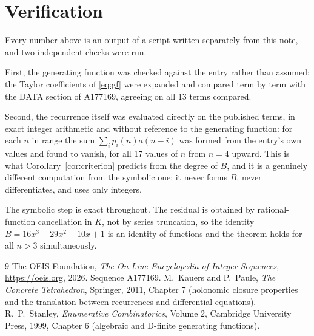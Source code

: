 \documentclass[11pt,a4paper]{article}
\theoremstyle{plain}
\theoremstyle{definition}
\begin{document}
\section{Verification}

Every number above is an output of a script written separately from this note, and two
independent checks were run.

First, the generating function was checked against the entry rather than assumed: the
Taylor coefficients of \eqref{eq:gf} were expanded and compared term by term with the DATA
section of A177169, agreeing on all 13 terms compared.

Second, the recurrence itself was evaluated directly on the published terms, in exact
integer arithmetic and without reference to the generating function: for each $n$ in range
the sum $\sum_{i}p_{i}(n)a(n-i)$ was formed from the entry's own values and found to
vanish, for all 17 values of $n$ from $n=4$ upward. This is what
Corollary~\ref{cor:criterion} predicts from the degree of $B$, and it is a genuinely
different computation from the symbolic one: it never forms $B$, never differentiates, and
uses only integers.

The symbolic step is exact throughout. The residual is obtained by rational-function
cancellation in $K$, not by series truncation, so the identity $B=16 x^{3} - 29 x^{2} + 10 x + 1$ is an
identity of functions and the theorem holds for all $n>3$ simultaneously.

\begin{thebibliography}{9}
 The OEIS Foundation, \emph{The On-Line Encyclopedia of Integer Sequences},
\url{https://oeis.org}, 2026. Sequence A177169.
 M.~Kauers and P.~Paule, \emph{The Concrete Tetrahedron}, Springer, 2011,
Chapter 7 (holonomic closure properties and the translation between recurrences and
differential equations).
 R.~P.~Stanley, \emph{Enumerative Combinatorics}, Volume 2, Cambridge
University Press, 1999, Chapter 6 (algebraic and D-finite generating functions).
\end{thebibliography}
\end{document}
